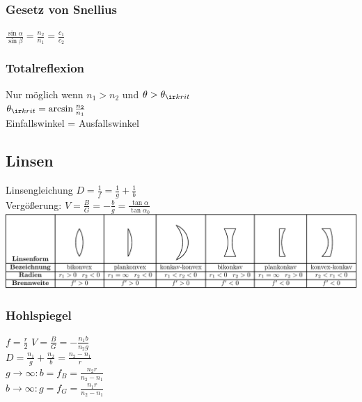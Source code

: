 \documentclass[german]{latex4ei/latex4ei_sheet}
\begin{document}
\subsubsection{Gesetz von Snellius}
$\frac{\sin \alpha}{\sin \beta} = \frac{n_2}{n_1} = \frac {c_1}{c_2}$
\subsubsection{Totalreflexion}
Nur möglich wenn $n_1 > n_2$ und $\theta > \theta_{\ir krit}$ \\
$\theta_{\ir krit} = \arcsin \frac{n_2}{n_1}$\\
Einfallswinkel = Ausfallswinkel


\subsection{Linsen}
Linsengleichung
$D=\frac{1}{f}=\frac{1}{g}+\frac{1}{b}$\\
Vergößerung: $V=\frac{B}{G}= - \frac{b}{g}=\frac{\tan \alpha}{\tan \alpha_0}$\\
\includegraphics[width=\columnwidth]{img/Linsen_crop.pdf}
\begin{sectionbox}
\subsubsection{Hohlspiegel}
$f=\frac{r}{2}$ \qquad $V=\frac{B}{G}= - \frac{n_1b}{n_2g}$ \\
$D=\frac{n_1}{g}+\frac{n_2}{b}=\frac{n_2-n_1}{r}$\\
$g\rightarrow \infty: b=f_B=\frac{n_2r}{n_2-n_1}$\\
$b\rightarrow \infty: g=f_G=\frac{n_1r}{n_2-n_1}$\\
\end{sectionbox}
\end{document}
